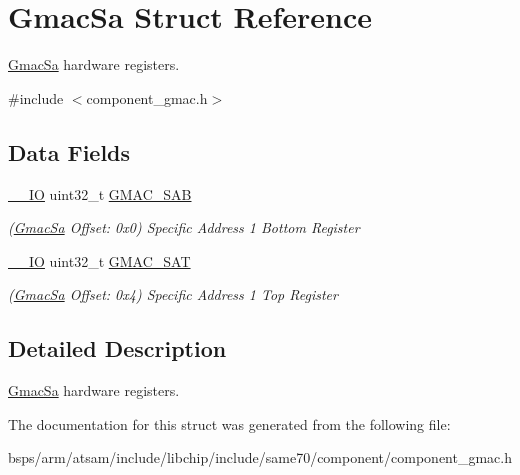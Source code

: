 \hypertarget{structGmacSa}{}\section{Gmac\+Sa Struct Reference}
\label{structGmacSa}


\mbox{\hyperlink{structGmacSa}{Gmac\+Sa}} hardware registers.  




{\ttfamily \#include $<$component\+\_\+gmac.\+h$>$}

\subsection*{Data Fields}
\begin{DoxyCompactItemize}
\item 
\mbox{\label{structGmacSa_af3d823f00fac29127ada97917e74f398}} 
\mbox{\hyperlink{core__cm7_8h_aec43007d9998a0a0e01faede4133d6be}{\+\_\+\+\_\+\+IO}} uint32\+\_\+t \mbox{\hyperlink{structGmacSa_af3d823f00fac29127ada97917e74f398}{G\+M\+A\+C\+\_\+\+S\+AB}}
\begin{DoxyCompactList}\small\item\em (\mbox{\hyperlink{structGmacSa}{Gmac\+Sa}} Offset\+: 0x0) Specific Address 1 Bottom Register \end{DoxyCompactList}\item 
\mbox{\label{structGmacSa_a080fee9930c80902b4c556238a2eb710}} 
\mbox{\hyperlink{core__cm7_8h_aec43007d9998a0a0e01faede4133d6be}{\+\_\+\+\_\+\+IO}} uint32\+\_\+t \mbox{\hyperlink{structGmacSa_a080fee9930c80902b4c556238a2eb710}{G\+M\+A\+C\+\_\+\+S\+AT}}
\begin{DoxyCompactList}\small\item\em (\mbox{\hyperlink{structGmacSa}{Gmac\+Sa}} Offset\+: 0x4) Specific Address 1 Top Register \end{DoxyCompactList}\end{DoxyCompactItemize}


\subsection{Detailed Description}
\mbox{\hyperlink{structGmacSa}{Gmac\+Sa}} hardware registers. 

The documentation for this struct was generated from the following file\+:\begin{DoxyCompactItemize}
\item 
bsps/arm/atsam/include/libchip/include/same70/component/component\+\_\+gmac.\+h\end{DoxyCompactItemize}
